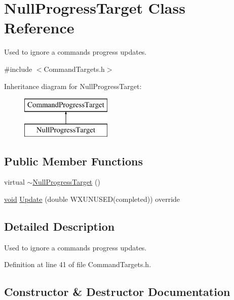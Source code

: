 \hypertarget{class_null_progress_target}{}\section{Null\+Progress\+Target Class Reference}
\label{class_null_progress_target}


Used to ignore a command\textquotesingle{}s progress updates.  




{\ttfamily \#include $<$Command\+Targets.\+h$>$}

Inheritance diagram for Null\+Progress\+Target\+:\begin{figure}[H]
\begin{center}
\leavevmode
\includegraphics[height=2.000000cm]{class_null_progress_target}
\end{center}
\end{figure}
\subsection*{Public Member Functions}
\begin{DoxyCompactItemize}
\item 
virtual \hyperlink{class_null_progress_target_a1b6693855bed9b1e76ef5488ab2c2183}{$\sim$\+Null\+Progress\+Target} ()
\item 
\hyperlink{sound_8c_ae35f5844602719cf66324f4de2a658b3}{void} \hyperlink{class_null_progress_target_a961b11850d93ac31b3535d476616195a}{Update} (double W\+X\+U\+N\+U\+S\+ED(completed)) override
\end{DoxyCompactItemize}


\subsection{Detailed Description}
Used to ignore a command\textquotesingle{}s progress updates. 

Definition at line 41 of file Command\+Targets.\+h.



\subsection{Constructor \& Destructor Documentation}
